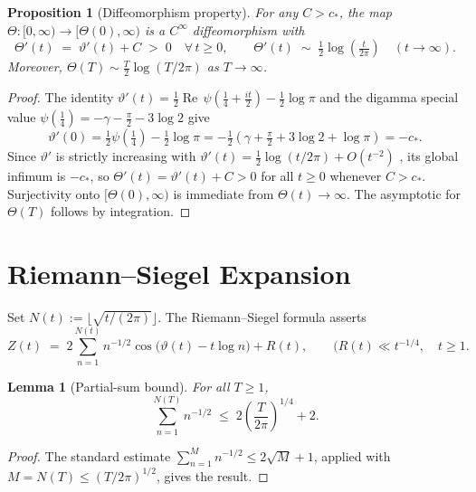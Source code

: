\documentclass[12pt]{amsart}
\newtheorem{lemma}[theorem]{Lemma}
\newtheorem{proposition}[theorem]{Proposition}
\theoremstyle{definition}
\theoremstyle{remark}
\DeclareMathOperator{\Rea}{Re}
\newcommand{\abs} [en.wikipedia](https://en.wikipedia.org/wiki/Z_function){\left|#1\right|}
\begin{document}
\begin{proposition}[Diffeomorphism property]\label{prop:diffeo}
For any $C>c_*$, the map $\Theta:[0,\infty)\to\bigl[\Theta(0),\infty\bigr)$
is a $C^{\infty}$ diffeomorphism with
\[
  \Theta'(t)\;=\;\vartheta'(t)+C\;>\;0 \quad\forall\,t\ge 0,
  \qquad
  \Theta'(t)\;\sim\;\tfrac{1}{2}\log\!\left(\tfrac{t}{2\pi}\right)
  \quad (t\to\infty).
\]
Moreover, $\Theta(T)\sim\tfrac{T}{2}\log(T/2\pi)$ as $T\to\infty$.
\end{proposition}

\begin{proof}
The identity
$\vartheta'(t)=\tfrac{1}{2}\Rea\,\psi\!\left(\tfrac{1}{4}+\tfrac{it}{2}\right)
-\tfrac{1}{2}\log\pi$
and the digamma special value
$\psi\!\left(\tfrac{1}{4}\right)
=-\gamma-\tfrac{\pi}{2}-3\log 2$
give
\[
  \vartheta'(0)
  = \tfrac{1}{2}\psi\!\left(\tfrac{1}{4}\right)-\tfrac{1}{2}\log\pi
  = -\tfrac{1}{2}\!\left(\gamma+\tfrac{\pi}{2}+3\log 2+\log\pi\right)
  = -c_*.
\]
Since $\vartheta'$ is strictly increasing with
$\vartheta'(t)=\tfrac{1}{2}\log(t/2\pi)+O(t^{-2})$ \cite{Titchmarsh1986},
its global infimum is $-c_*$, so $\Theta'(t)=\vartheta'(t)+C>0$ for all
$t\ge 0$ whenever $C>c_*$.  Surjectivity onto $[\Theta(0),\infty)$ is
immediate from $\Theta(t)\to\infty$.  The asymptotic for $\Theta(T)$
follows by integration.
\end{proof}

\section{Riemann--Siegel Expansion}

Set $N(t):=\lfloor\sqrt{t/(2\pi)}\rfloor$.
The Riemann--Siegel formula \cite{Siegel1932,Titchmarsh1986} asserts
\begin{equation}\label{eq:RS}
  Z(t) \;=\; 2\sum_{n=1}^{N(t)}n^{-1/2}
  \cos\!\bigl(\vartheta(t)-t\log n\bigr) + R(t),
  \qquad\abs{R(t)}\ll t^{-1/4},\quad t\ge 1.
\end{equation}

\begin{lemma}[Partial-sum bound]\label{lem:partial}
For all $T\ge 1$,
\[
  \sum_{n=1}^{N(T)}n^{-1/2}
  \;\le\; 2\!\left(\frac{T}{2\pi}\right)^{1/4}+2.
\]
\end{lemma}

\begin{proof}
The standard estimate $\sum_{n=1}^{M}n^{-1/2}\le 2\sqrt{M}+1$,
applied with $M=N(T)\le(T/2\pi)^{1/2}$, gives the result.
\end{proof}
\end{document}
